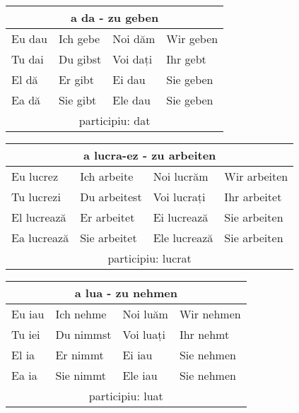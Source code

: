 \documentclass[11pt, oneside]{article}
\begin{document}
%
\begin{center}
  \begin{tabular}{ |p{3.25cm}|p{3.25cm}||p{3.25cm}|p{3.25cm}| }
      \hline
      \multicolumn{4}{|c|}{a da - zu geben} \\
      \hline
      \hline
      Eu dau & Ich gebe & Noi dăm & Wir geben\\
      \hline
      Tu dai & Du gibst & Voi dați & Ihr gebt\\
      \hline
      El dă & Er gibt & Ei dau & Sie geben\\ 
      Ea dă & Sie gibt & Ele dau & Sie geben\\
      \hline
      \multicolumn{4}{|c|}{participiu: dat} \\
      \hline
     \end{tabular}
\end{center}
%
\begin{center}
  \begin{tabular}{ |p{3.25cm}|p{3.25cm}||p{3.25cm}|p{3.25cm}| }
      \hline
      \multicolumn{4}{|c|}{a lucra-ez - zu arbeiten} \\
      \hline
      \hline
      Eu lucrez & Ich arbeite & Noi lucrăm & Wir arbeiten\\
      \hline
      Tu lucrezi & Du arbeitest & Voi lucrați & Ihr arbeitet\\
      \hline
      El lucrează & Er arbeitet & Ei lucrează & Sie arbeiten\\ 
      Ea lucrează & Sie arbeitet & Ele lucrează & Sie arbeiten\\
      \hline
      \multicolumn{4}{|c|}{participiu: lucrat} \\
      \hline
     \end{tabular}
\end{center}
%
\begin{center}
  \begin{tabular}{ |p{3.25cm}|p{3.25cm}||p{3.25cm}|p{3.25cm}| }
      \hline
      \multicolumn{4}{|c|}{a lua - zu nehmen} \\
      \hline
      \hline
      Eu iau & Ich nehme & Noi luăm & Wir nehmen\\
      \hline
      Tu iei & Du nimmst & Voi luați & Ihr nehmt\\
      \hline
      El ia & Er nimmt & Ei iau & Sie nehmen\\ 
      Ea ia & Sie nimmt & Ele iau & Sie nehmen\\
      \hline
      \multicolumn{4}{|c|}{participiu: luat} \\
      \hline
     \end{tabular}
\end{center}
\end{document}
